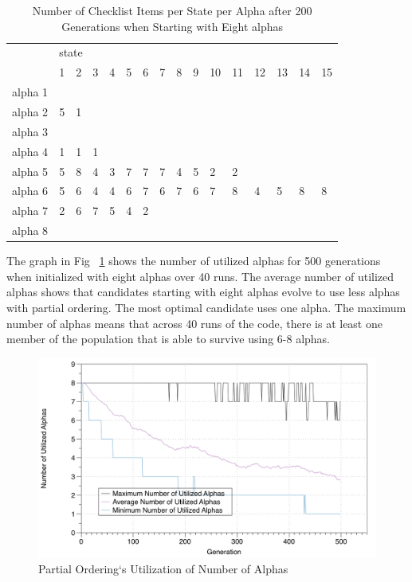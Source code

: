 \documentclass[3p,times,procedia]{elsarticle}
\begin{document}
\begin{table}
\caption{Number of Checklist Items per State per Alpha after 200 Generations when Starting with Eight alphas}
\label{PartialOrderingPrefersLessAlphas}
\begin{tabular}{llllllllllllllll}
\hline
 & \multicolumn{15}{l}{state} \\ 
 & 1  & 2  & 3  & 4  & 5  & 6  & 7  & 8  & 9  & 10  & 11  & 12  & 13  & 14  & 15 \\ \hline
alpha 1 &   &   &   &   &   &   &   &   &   &   &   &   &   &   &   \\ 
alpha 2 & 5 & 1 &   &   &   &   &   &   &   &   &   &   &   &   &   \\ 
alpha 3 &   &   &   &   &   &   &   &   &   &   &   &   &   &   &   \\ 
alpha 4 & 1 & 1 & 1 &   &   &   &   &   &   &   &   &   &   &   &   \\ 
alpha 5 & 5 & 8 & 4 & 3 & 7 & 7 & 7 & 4 & 5 & 2 & 2 &   &   &   &   \\ 
alpha 6 & 5 & 6 & 4 & 4 & 6 & 7 & 6 & 7 & 6 & 7 & 8 & 4 & 5 & 8 & 8 \\ 
alpha 7 & 2 & 6 & 7 & 5 & 4 & 2 &   &   &   &   &   &   &   &   &   \\ 
alpha 8 &   &   &   &   &   &   &   &   &   &   &   &   &   &   &   \\ \hline
\end{tabular}
\end{table}

The graph in Fig ~\ref{NumberOfAlphasPartialOrdering} shows the  number of utilized alphas for 500 generations when initialized with eight alphas over 40 runs. The average number of utilized alphas shows that candidates starting with eight alphas evolve to use less alphas with partial ordering. The most optimal candidate uses one alpha. 
The maximum number of alphas means that across 40 runs of the code, there is at least one member of the population that is able to survive using 6-8 alphas. 

\begin{figure}[ht]\vspace*{4pt}
\centerline{\includegraphics[width=6.25in]{images/number_of_alphas_partial_ordering_500gens_40runs_8alpha}}
\caption{Partial Ordering`s Utilization of Number of Alphas}\vspace*{-6pt}
\label{NumberOfAlphasPartialOrdering}
\end{figure}
\end{document}
